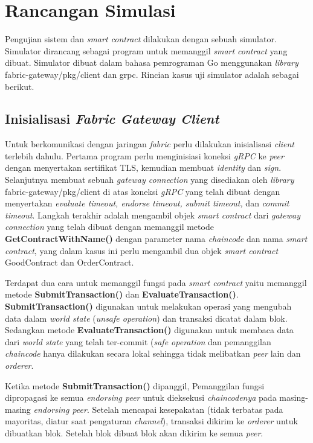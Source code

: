

\section{Rancangan Simulasi}
\label{sec:simulation}
Pengujian sistem dan \textit{smart contract} dilakukan dengan sebuah simulator. Simulator dirancang sebagai program untuk memanggil \textit{smart contract} yang dibuat. Simulator dibuat dalam bahasa pemrograman Go menggunakan \textit{library} fabric-gateway/pkg/client dan grpc. Rincian kasus uji simulator adalah sebagai berikut.

\subsection{Inisialisasi \textit{Fabric Gateway Client}}
Untuk berkomunikasi dengan jaringan \textit{fabric} perlu dilakukan inisialisasi \textit{client} terlebih dahulu. Pertama program perlu menginisiasi koneksi \textit{gRPC} ke \textit{peer} dengan menyertakan sertifikat TLS, kemudian membuat \textit{identity} dan \textit{sign}. Selanjutnya membuat sebuah \textit{gateway connection} yang disediakan oleh \textit{library} fabric-gateway/pkg/client di atas koneksi \textit{gRPC} yang telah dibuat dengan menyertakan \textit{evaluate timeout, endorse timeout, submit timeout,} dan \textit{commit timeout}. Langkah terakhir adalah mengambil objek \textit{smart contract} dari \textit{gateway connection} yang telah dibuat dengan memanggil metode \textbf{GetContractWithName()} dengan parameter nama \textit{chaincode} dan nama \textit{smart contract}, yang dalam kasus ini perlu mengambil dua objek \textit{smart contract} GoodContract dan OrderContract. 

Terdapat dua cara untuk memanggil fungsi pada \textit{smart contract} yaitu memanggil metode \textbf{SubmitTransaction()} dan \textbf{EvaluateTransaction()}. \textbf{SubmitTransaction()} digunakan untuk melakukan operasi yang mengubah data dalam \textit{world state} (\textit{unsafe operation}) dan transaksi dicatat dalam blok. Sedangkan metode \textbf{EvaluateTransaction()} digunakan untuk membaca data dari \textit{world state} yang telah ter-commit (\textit{safe operation} dan pemanggilan \textit{chaincode} hanya dilakukan secara lokal sehingga tidak melibatkan \textit{peer} lain dan \textit{orderer}.

Ketika metode \textbf{SubmitTransaction()} dipanggil, Pemanggilan fungsi dipropagasi ke semua \textit{endorsing peer} untuk dieksekusi \textit{chaincodenya} pada masing-masing \textit{endorsing peer}. Setelah mencapai kesepakatan (tidak terbatas pada mayoritas, diatur saat pengaturan \textit{channel}), transaksi dikirim ke \textit{orderer} untuk dibuatkan blok. Setelah blok dibuat blok akan dikirim ke semua \textit{peer}.

